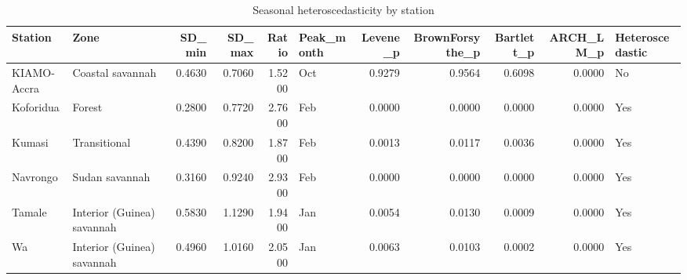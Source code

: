 \begin{table}[H]
\centering
\caption{Seasonal heteroscedasticity by station}
\label{tab:hetero}
\begin{singlespace}
\begin{tabular}{llrrrlrrrrl}
\toprule
Station & Zone & SD\_min & SD\_max & Ratio & Peak\_month & Levene\_p & BrownForsythe\_p & Bartlett\_p & ARCH\_LM\_p & Heteroscedastic \\
\midrule
KIAMO-Accra & Coastal savannah & 0.4630 & 0.7060 & 1.5200 & Oct & 0.9279 & 0.9564 & 0.6098 & 0.0000 & No \\
Koforidua & Forest & 0.2800 & 0.7720 & 2.7600 & Feb & 0.0000 & 0.0000 & 0.0000 & 0.0000 & Yes \\
Kumasi & Transitional & 0.4390 & 0.8200 & 1.8700 & Feb & 0.0013 & 0.0117 & 0.0036 & 0.0000 & Yes \\
Navrongo & Sudan savannah & 0.3160 & 0.9240 & 2.9300 & Feb & 0.0000 & 0.0000 & 0.0000 & 0.0000 & Yes \\
Tamale & Interior (Guinea) savannah & 0.5830 & 1.1290 & 1.9400 & Jan & 0.0054 & 0.0130 & 0.0009 & 0.0000 & Yes \\
Wa & Interior (Guinea) savannah & 0.4960 & 1.0160 & 2.0500 & Jan & 0.0063 & 0.0103 & 0.0002 & 0.0000 & Yes \\
\bottomrule
\end{tabular}
\end{singlespace}
\end{table}
